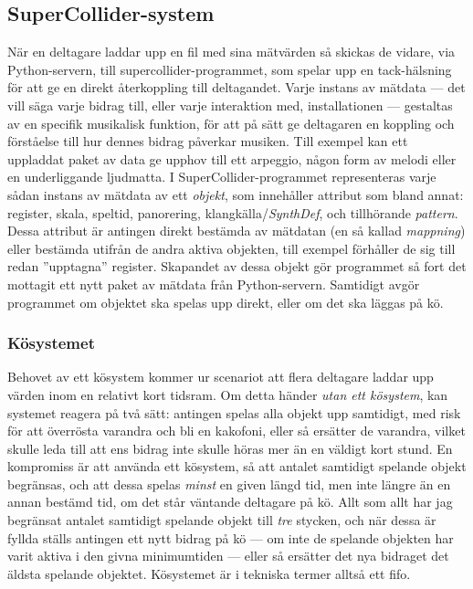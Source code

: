 \documentclass[11pt, a4paper]{article} %
\begin{document}
\subsection*{SuperCollider-system}
När en deltagare laddar upp en fil med sina mätvärden så skickas de vidare, via Python-servern, till \gls{supercollider}-programmet, som spelar upp en tack-hälsning för att ge en direkt återkoppling till deltagandet. Varje instans av mätdata --- det vill säga varje bidrag till, eller varje interaktion med, installationen --- gestaltas av en specifik musikalisk funktion, för att på sätt ge deltagaren en koppling och förståelse till hur dennes bidrag påverkar musiken. Till exempel kan ett uppladdat paket av data ge upphov till ett arpeggio, någon form av melodi eller en underliggande ljudmatta. I SuperCollider-programmet representeras varje sådan instans av mätdata av ett \emph{objekt}, som innehåller attribut som bland annat: register, skala, speltid, panorering, klangkälla/\emph{SynthDef}, och tillhörande \emph{\gls{pattern}}. Dessa attribut är antingen direkt bestämda av mätdatan (en så kallad \emph{mappning}) eller bestämda utifrån de andra aktiva objekten, till exempel förhåller de sig till redan ''upptagna'' register. Skapandet av dessa objekt gör programmet så fort det mottagit ett nytt paket av mätdata från Python-servern. Samtidigt avgör programmet om objektet ska spelas upp direkt, eller om det ska läggas på kö. 

\subsubsection*{Kösystemet}
Behovet av ett kösystem kommer ur scenariot att flera deltagare laddar upp värden inom en relativt kort tidsram. Om detta händer \emph{utan ett kösystem}, kan systemet reagera på två sätt: antingen spelas alla objekt upp samtidigt, med risk för att överrösta varandra och bli en kakofoni, eller så ersätter de varandra, vilket skulle leda till att ens bidrag inte skulle höras mer än en väldigt kort stund. En kompromiss är att använda ett kösystem, så att antalet samtidigt spelande objekt begränsas, och att dessa spelas \emph{minst} en given längd tid, men inte längre än en annan bestämd tid, om det står väntande deltagare på kö. Allt som allt har jag begränsat antalet samtidigt spelande objekt till \emph{tre} stycken, och när dessa är fyllda ställs antingen ett nytt bidrag på kö --- om inte de spelande objekten har varit aktiva i den givna minimumtiden --- eller så ersätter det nya bidraget det äldsta spelande objektet. Kösystemet är i tekniska termer alltså ett \gls{fifo}.
\end{document}
